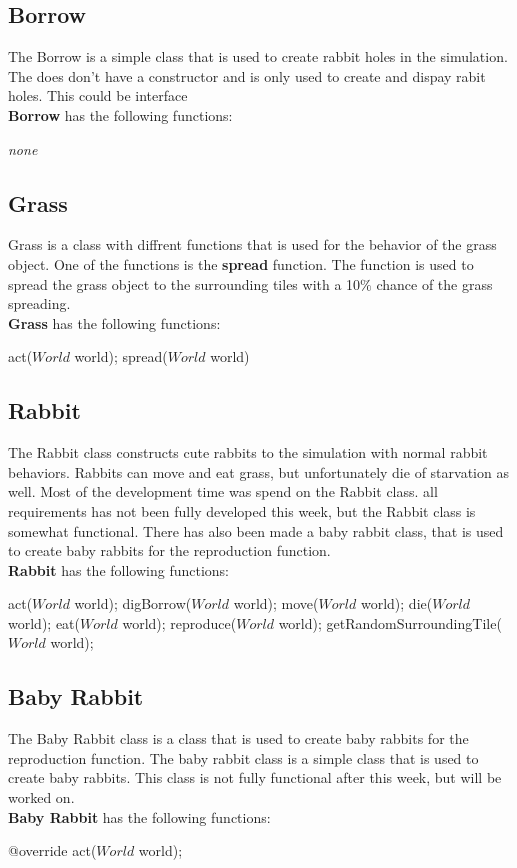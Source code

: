\documentclass[11pt]{article}
\begin{document}
    \subsection*{Borrow}
    The Borrow is a simple class that is used to create rabbit holes in the simulation. The does don't have a constructor and is only used to create and dispay rabit holes. This could be interface 
    \\
    \textbf{Borrow} has the following functions:
    \begin{mdframed}
        \textit{none}
    \end{mdframed}
    \subsection*{Grass}
    Grass is a class with diffrent functions that is used for the behavior of the grass object. One of the functions is the \textbf{spread} function. The function is used to spread the grass object to the surrounding tiles with a 10$\%$ chance of the grass spreading. 
    \\
    \textbf{Grass} has the following functions:
    \begin{mdframed}
        act($World$ world); spread($World$ world)
    \end{mdframed}
    \newpage
    \subsection*{Rabbit}
    The Rabbit class constructs cute rabbits to the simulation with normal rabbit behaviors. Rabbits can move and eat grass, but unfortunately die of starvation as well. 
    Most of the development time was spend on the Rabbit class. all requirements has not been fully developed this week, but the Rabbit class is somewhat functional. 
    There has also been made a baby rabbit class, that is used to create baby rabbits for the reproduction function.
    \\
    \textbf{Rabbit} has the following functions:
    \begin{mdframed}
        act($World$ world); digBorrow($World$ world); move($World$ world); die($World$ world); eat($World$ world); reproduce($World$ world); getRandomSurroundingTile($World$ world); 
    \end{mdframed}
    \subsection*{Baby Rabbit}
    The Baby Rabbit class is a class that is used to create baby rabbits for the reproduction function. The baby rabbit class is a simple class that is used to create baby rabbits. This class is not fully functional after this week, but will be worked on.
    \\
    \textbf{Baby Rabbit} has the following functions:
    \begin{mdframed}
        @override act($World$ world); 
    \end{mdframed}
\end{document}
